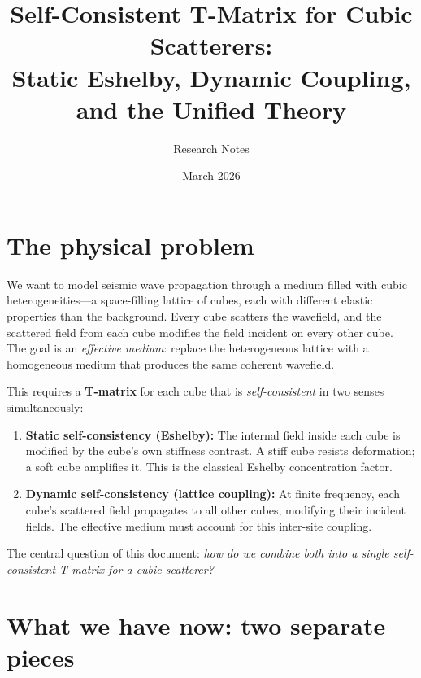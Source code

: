 \documentclass[11pt,a4paper]{article}
\title{Self-Consistent T-Matrix for Cubic Scatterers:\\
Static Eshelby, Dynamic Coupling, and the Unified Theory}
\author{Research Notes}
\date{March 2026}
\begin{document}
\maketitle

\tableofcontents
\vspace{1em}

\section{The physical problem}

We want to model seismic wave propagation through a medium filled with
cubic heterogeneities---a space-filling lattice of cubes, each with
different elastic properties than the background.  Every cube scatters
the wavefield, and the scattered field from each cube modifies the
field incident on every other cube.  The goal is an \emph{effective
medium}: replace the heterogeneous lattice with a homogeneous medium
that produces the same coherent wavefield.

This requires a \textbf{T-matrix} for each cube that is
\emph{self-consistent} in two senses simultaneously:
\begin{enumerate}[nosep]
  \item \textbf{Static self-consistency (Eshelby):} The internal field
    inside each cube is modified by the cube's own stiffness contrast.
    A stiff cube resists deformation; a soft cube amplifies it.  This
    is the classical Eshelby concentration factor.
  \item \textbf{Dynamic self-consistency (lattice coupling):} At finite
    frequency, each cube's scattered field propagates to all other cubes,
    modifying their incident fields.  The effective medium must account
    for this inter-site coupling.
\end{enumerate}

The central question of this document: \emph{how do we combine both
into a single self-consistent T-matrix for a cubic scatterer?}

\section{What we have now: two separate pieces}
\end{document}

